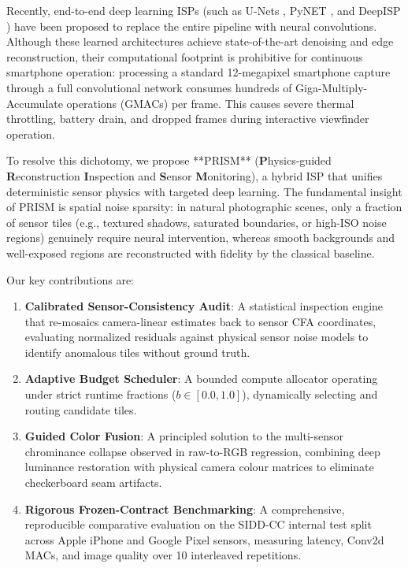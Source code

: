 \documentclass[10pt,twocolumn]{article}
\begin{document}
Recently, end-to-end deep learning ISPs (such as U-Nets \cite{ronneberger2015u}, PyNET \cite{ignatov2020pynet}, and DeepISP \cite{schwartz2018deepisp}) have been proposed to replace the entire pipeline with neural convolutions. Although these learned architectures achieve state-of-the-art denoising and edge reconstruction, their computational footprint is prohibitive for continuous smartphone operation: processing a standard 12-megapixel smartphone capture through a full convolutional network consumes hundreds of Giga-Multiply-Accumulate operations (GMACs) per frame. This causes severe thermal throttling, battery drain, and dropped frames during interactive viewfinder operation.

To resolve this dichotomy, we propose **PRISM** (\textbf{P}hysics-guided \textbf{R}econstruction \textbf{I}nspection and \textbf{S}ensor \textbf{M}onitoring), a hybrid ISP that unifies deterministic sensor physics with targeted deep learning. The fundamental insight of PRISM is spatial noise sparsity: in natural photographic scenes, only a fraction of sensor tiles (e.g., textured shadows, saturated boundaries, or high-ISO noise regions) genuinely require neural intervention, whereas smooth backgrounds and well-exposed regions are reconstructed with fidelity by the classical baseline.

Our key contributions are:
\begin{enumerate}
    \item \textbf{Calibrated Sensor-Consistency Audit}: A statistical inspection engine that re-mosaics camera-linear estimates back to sensor CFA coordinates, evaluating normalized residuals against physical sensor noise models to identify anomalous tiles without ground truth.
    \item \textbf{Adaptive Budget Scheduler}: A bounded compute allocator operating under strict runtime fractions ($b \in [0.0, 1.0]$), dynamically selecting and routing candidate tiles.
    \item \textbf{Guided Color Fusion}: A principled solution to the multi-sensor chrominance collapse observed in raw-to-RGB regression, combining deep luminance restoration with physical camera colour matrices to eliminate checkerboard seam artifacts.
    \item \textbf{Rigorous Frozen-Contract Benchmarking}: A comprehensive, reproducible comparative evaluation on the SIDD-CC internal test split across Apple iPhone and Google Pixel sensors, measuring latency, Conv2d MACs, and image quality over 10 interleaved repetitions.
\end{enumerate}
\end{document}
